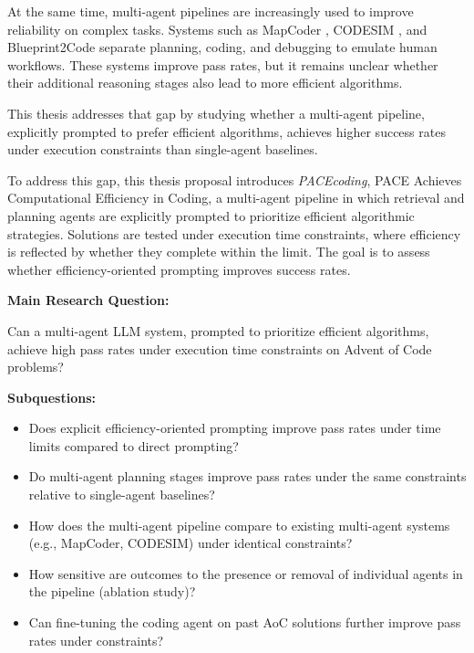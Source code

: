 \documentclass{article}
\begin{document}
At the same time, multi-agent pipelines are increasingly used to improve reliability on complex tasks. Systems such as MapCoder \cite{islam2024}, CODESIM \cite{islam2025}, and Blueprint2Code \cite{mao2025} separate planning, coding, and debugging to emulate human workflows. These systems improve pass rates, but it remains unclear whether their additional reasoning stages also lead to more efficient algorithms.

This thesis addresses that gap by studying whether a multi-agent pipeline, explicitly prompted to prefer efficient algorithms, achieves higher success rates under execution constraints than single-agent baselines.

To address this gap, this thesis proposal introduces \textit{PACEcoding}, PACE Achieves Computational Efficiency in Coding, a multi-agent pipeline in which retrieval and planning agents are explicitly prompted to prioritize efficient algorithmic strategies. Solutions are tested under execution time constraints, where efficiency is reflected by whether they complete within the limit. The goal is to assess whether efficiency-oriented prompting improves success rates.

\textbf{Main Research Question:}

\begin{center}
Can a multi-agent LLM system, prompted to prioritize efficient algorithms, achieve high pass rates under execution time constraints on Advent of Code problems?
\end{center}

\textbf{Subquestions:}

\begin{itemize}[noitemsep]
    \item Does explicit efficiency-oriented prompting improve pass rates under time limits compared to direct prompting?
    \item Do multi-agent planning stages improve pass rates under the same constraints relative to single-agent baselines?
    \item How does the multi-agent pipeline compare to existing multi-agent systems (e.g., MapCoder, CODESIM) under identical constraints?
    \item How sensitive are outcomes to the presence or removal of individual agents in the pipeline (ablation study)?
    \item Can fine-tuning the coding agent on past AoC solutions further improve pass rates under constraints?
\end{itemize}
\end{document}
